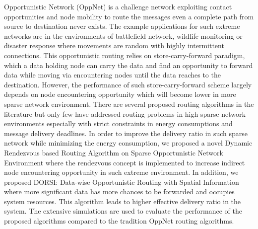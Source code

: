 %

Opportunistic Network (OppNet) is a challenge network exploiting contact opportunities and node mobility to route the messages even a complete path from source to destination never exists.
The example applications for such extreme networks are in the environments of battlefield network, wildlife monitoring or disaster response  where movements are random with highly intermittent connections. 
This opportunistic routing relies on store-carry-forward paradigm, which a data holding node can carry the data and find an opportunity to forward data while moving via encountering nodes until the data reaches to the destination.
However, the performance of such store-carry-forward scheme largely depends on node encountering opportunity which will become lower in more sparse network environment.
%
There are several proposed routing algorithms in the literature but only few have addressed routing problems in high sparse network environments especially with strict constraints in energy consumptions and message delivery deadlines.
%
In order to improve the delivery ratio in such sparse network while minimizing the energy consumption, we proposed a novel Dynamic Rendezvous based Routing Algorithm on Sparse Opportunistic Network Environment where the rendezvous concept is implemented to increase indirect node encountering opportunity in such extreme environment.
In addition, we proposed DORSI: Data-wise Opportunistic Routing with Spatial Information where more significant data has more chances to be forwarded and occupies system resources.
%
This algorithm leads to higher effective delivery ratio in the system.
%
The extensive simulations are used to evaluate the performance of the proposed algorithms compared to the tradition OppNet routing algorithms.


